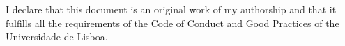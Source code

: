 \hspace{0.4cm} I declare that this document is an original work of my authorship and that it fulfills all the requirements of the Code of Conduct and Good Practices of the Universidade de Lisboa. 
